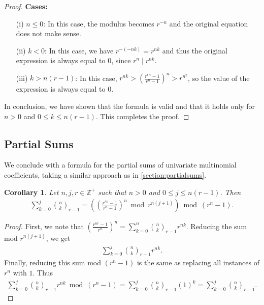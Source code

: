\documentclass{article}
\theoremstyle{plain}
\newtheorem{corollary}[theorem]{Corollary}
\theoremstyle{definition}
\begin{document}
\begin{proof}
\textbf{Cases:}
\begin{enumerate}
    \item[(i)] $n \leq 0$: In this case, the modulus becomes $r^{-n}$ and the original equation does not make sense.
    \item[(ii)] $k < 0$: In this case, we have $r^{-(-nk)} = r^{nk}$ and thus the original expression is always equal to $0$, since $r^{n} \mid r^{nk}$.
    \item[(iii)] $k > n (r-1)$: In this case, $r^{nk} > \left(\frac{r^{rn} - 1}{r^{n} - 1}\right)^{n} > r^{n^2}$, so the value of the expression is always equal to $0$.
\end{enumerate}

In conclusion, we have shown that the formula is valid and that it holds only for $n > 0$ and $0 \leq k \leq n(r-1)$. This completes the proof.
\end{proof}

\subsection{Partial Sums}
We conclude with a formula for the partial sums of univariate multinomial coefficients, taking a similar approach as in \cref{section:partialsums}.

\begin{corollary} \label{proof:multinomialcoeffpartialsums}
Let $n,j,r \in \mathbb{Z}^+$ such that $n > 0$ and $0 \leq j \leq n (r-1)$. Then
\begin{align*}
\sum_{k=0}^{j} \binom{n}{k}_{r-1}
= \left( \left( \frac{r^{rn}-1}{r^n-1} \right)^n \bmod r^{n(j+1)} \right) \bmod (r^n-1) .
\end{align*}
\end{corollary}
\begin{proof}
First, we note that $\left(\frac{r^{nr}-1}{r^n}\right)^n = \sum_{k=0}^n \binom{n}{k}_{r-1} r^{nk}$. Reducing the sum mod $r^{n(j+1)}$, we get
\begin{align*}
    \sum_{k=0}^{j} \binom{n}{k}_{r-1} r^{nk} .
\end{align*}
Finally, reducing this sum mod $(r^n-1)$ is the same as replacing all instances of $r^n$ with $1$. Thus
\begin{align*}
    \sum_{k=0}^{j} \binom{n}{k}_{r-1} r^{nk} \bmod (r^n-1)
    = \sum_{k=0}^{j} \binom{n}{k}_{r-1} (1)^{k}
    = \sum_{k=0}^{j} \binom{n}{k}_{r-1} .
\end{align*}
\end{proof}

\begingroup
\raggedright


\endgroup
\end{document}
